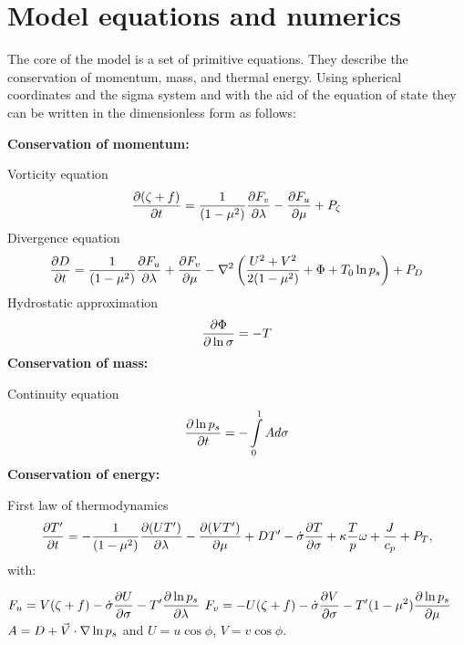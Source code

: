 \section{Model equations and numerics}

The core of the model is a set of primitive equations. They describe
the conservation of momentum, mass, and thermal energy.
Using spherical coordinates and the sigma system and with
the aid of the equation of state they can be written in the
dimensionless form as follows:

{\bf Conservation of momentum:}

Vorticity equation
\begin{equation}
\frac{\partial (\zeta + f)}{\partial t} = \frac{1}{(1-\mu^2)}\frac{\partial F_v}{\partial \lambda}-\frac{\partial F_u}{\partial \mu}+P_{\zeta}
\label{vortgl}
\end{equation}
Divergence equation
\begin{equation}
\frac{\partial D}{\partial t} = \frac{1}{(1-\mu^2)}\frac{\partial F_u}{\partial \lambda}+\frac{\partial F_v}{\partial \mu}-\nabla^2\left(\frac{U^2+V^2}{2(1-\mu^2)}+\Phi+T_0\ln p_s\right)+P_D
\label{divgl}
\end{equation}
Hydrostatic approximation
\begin{equation}
\frac{\partial \Phi}{\partial \ln\sigma} = -T
\label{hydrogl}
\end{equation}
{\bf Conservation of mass:}

Continuity equation
\begin{equation}
\frac{\partial \ln p_s}{\partial t} = -\int\limits_0^1Ad\sigma
\label{kontigl}
\end{equation}
{\bf Conservation of energy:}

First law of thermodynamics
\begin{equation}
\frac{\partial T'}{\partial t} = -\frac{1}{(1-\mu^2)}\frac{\partial (UT')}{\partial \lambda}-\frac{\partial (VT')}{\partial \mu}+DT'-\dot{\sigma}\frac{\partial T}{\partial \sigma}+\kappa\frac{T}{p}\omega+\frac{J}{c_p}+P_T,
\label{thermogl}
\end{equation}
with:

\bfl
$ \displaystyle F_u = V(\zeta+f)-\dot{\sigma}\frac{\partial U}{\partial \sigma}-T'\frac{\partial \ln p_s}{\partial \lambda} $
\efl
\bfl
$ \displaystyle F_v = -U(\zeta+f)-\dot{\sigma}\frac{\partial V}{\partial \sigma}-T'(1-\mu^2)\frac{\partial \ln p_s}{\partial \mu} $
\efl
\bfl
$ \displaystyle A = D+\vec{V}\cdot\nabla\ln p_s $
\efl
and \quad $U = u\cos\phi$, $V = v\cos\phi$.

